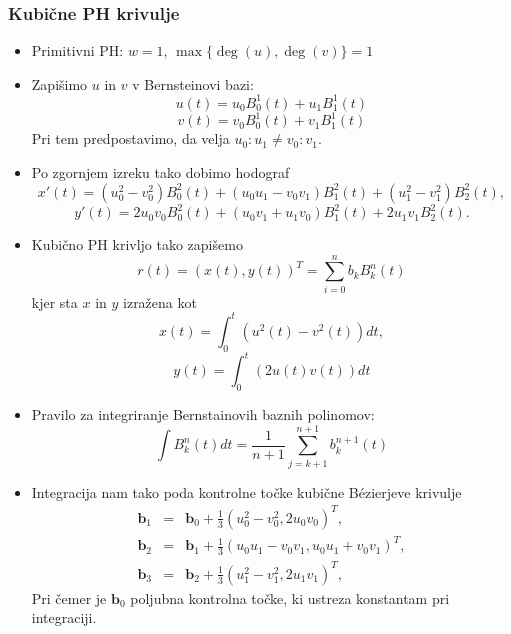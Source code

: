 \documentclass[12pt]{beamer}
\theoremstyle{definition} %
\theoremstyle{plain} %
\begin{document}
\begin{frame}
\frametitle{Kubične PH krivulje}
    \begin{itemize}
        \item Primitivni PH: $w=1$, $\max{\{\deg(u), \deg(v)\}} = 1$
        \item Zapišimo $u$ in $v$ v Bernsteinovi bazi:
              $$ u(t) = u_0 B_0^1(t) + u_1 B_1^1(t) $$
              $$ v(t) = v_0 B_0^1(t) + v_1 B_1^1(t) $$
              Pri tem predpostavimo, da velja $u_0 : u_1 \neq v_0 : v_1$.
        \item Po zgornjem izreku tako dobimo hodograf
              $$x'(t) = (u_0^2 - v_0^2)B_0^2(t) + (u_0 u_1 - v_0 v_1) B_1^2(t) + (u_1^2 - v_1^2) B_2^2(t),$$
              $$y'(t) = 2 u_0 v_0 B_0^2(t) + (u_0 v_1 + u_1 v_0) B_1^2(t) + 2 u_1 v_1 B_2^2(t).$$
    \end{itemize}
\end{frame}
\begin{frame}
    \begin{itemize}
        \item Kubično PH krivljo tako zapišemo 
              $$ r(t) = (x(t), y(t))^T = \sum_{i=0}^{n}{b_k B_k^n(t)} $$
              kjer sta $x$ in $y$ izražena kot
              $$x(t) = \int_0^t (u^2(t) - v^2(t)) dt,$$
              $$y(t) = \int_0^t (2u(t)v(t))dt$$
        \item Pravilo za integriranje Bernstainovih baznih polinomov:
              $$\int B^n_k(t) dt = \frac{1}{n+1} \sum_{j=k+1}^{n+1} b^{n+1}_k(t)$$
    \end{itemize}
\end{frame}

\begin{frame}
    \begin{itemize}
        \item Integracija nam tako poda kontrolne točke kubične B\'ezierjeve krivulje
                \begin{eqnarray}
                    \textbf{b}_1 &=& \textbf{b}_0 + \frac{1}{3}(u_0^2 - v_0^2, 2 u_0 v_0)^T,\nonumber\\
                    \textbf{b}_2 &=& \textbf{b}_1 + \frac{1}{3}(u_0 u_1 - v_0 v_1, u_0 u_1 + v_0 v_1)^T,\nonumber\\
                    \textbf{b}_3 &=& \textbf{b}_2 + \frac{1}{3} (u_1^2 - v_1^2, 2 u_1 v_1)^T,\nonumber
                \end{eqnarray}
              Pri čemer je $\textbf{b}_0$ poljubna kontrolna točke, ki ustreza konstantam pri integraciji.
    \end{itemize}
\end{frame}
\end{document}
